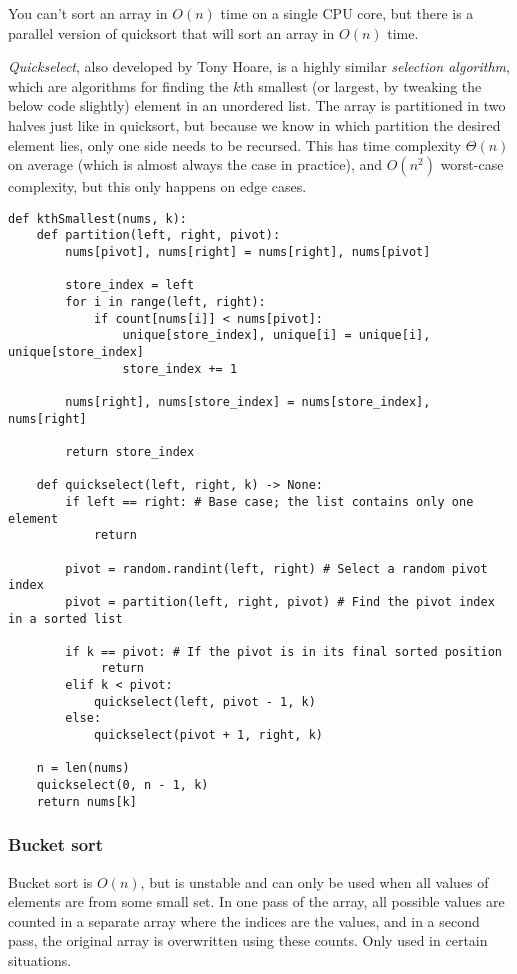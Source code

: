 \documentclass[8pt, table, xcdraw]{article}%
\begin{document}
You can’t sort an array in $O(n)$ time on a single CPU core, but there is a parallel version of quicksort that will sort an array in $O(n)$ time.

\emph{Quickselect}, also developed by Tony Hoare, is a highly similar \emph{selection algorithm}, which are algorithms for finding the $k$th smallest (or largest, by tweaking the below code slightly) element in an unordered list. The array is partitioned in two halves just like in quicksort, but because we know in which partition the desired element lies, only one side needs to be recursed. This has time complexity $\Theta(n)$ on average (which is almost always the case in practice), and $O(n^2)$ worst-case complexity, but this only happens on edge cases.

\begin{lstlisting}
def kthSmallest(nums, k):
    def partition(left, right, pivot):
        nums[pivot], nums[right] = nums[right], nums[pivot]
        
        store_index = left
        for i in range(left, right):
            if count[nums[i]] < nums[pivot]:
                unique[store_index], unique[i] = unique[i], unique[store_index]
                store_index += 1

        nums[right], nums[store_index] = nums[store_index], nums[right]
        
        return store_index
    
    def quickselect(left, right, k) -> None:
        if left == right: # Base case; the list contains only one element
            return
        
        pivot = random.randint(left, right) # Select a random pivot index
        pivot = partition(left, right, pivot) # Find the pivot index in a sorted list
        
        if k == pivot: # If the pivot is in its final sorted position
             return
        elif k < pivot:
            quickselect(left, pivot - 1, k)
        else:
            quickselect(pivot + 1, right, k)

    n = len(nums)
    quickselect(0, n - 1, k)
    return nums[k]
\end{lstlisting}

\subsubsection{Bucket sort}

Bucket sort is $O(n)$, but is unstable and can only be used when all values of elements are from some small set. In one pass of the array, all possible values are counted in a separate array where the indices are the values, and in a second pass, the original array is overwritten using these counts. Only used in certain situations.
\end{document}
